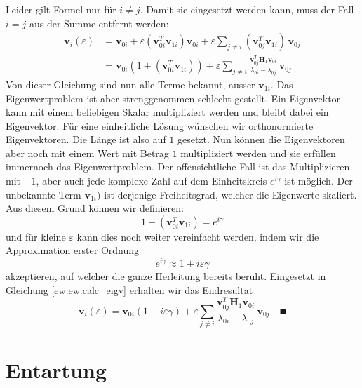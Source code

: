 Leider gilt Formel  nur für $i \neq j$. Damit sie eingesetzt werden kann, muss der Fall $i = j$ aus der Summe entfernt werden:
\begin{align}
    \bm v_i(\varepsilon)
    &=
    \bm v_{0i} + \varepsilon \left( \bm v_{0i}^T \bm v_{1i} \right) \bm v_{0i} + \varepsilon \sum_{j \neq i} \left(\bm v_{0j}^T \bm v_{1i} \right) \, \bm v_{0j} \\
    &=
    \bm v_{0i} \left( 1 + (\bm v_{0i}^T \bm v_{1i}) \right) + \varepsilon \sum_{j \neq i}
    \frac{\bm v_{0j}^T \bm H_1 \bm v_{0i}}{\lambda_{0i} - \lambda_{0j}}
    \, \bm v_{0j} \label{ew:ew:calc_eigv}
\end{align}
Von dieser Gleichung sind nun alle Terme bekannt, ausser $\bm v_{1i}$.
Das Eigenwertproblem ist aber strenggenommen schlecht gestellt.
Ein Eigenvektor kann mit einem beliebigen Skalar multipliziert werden und bleibt dabei ein Eigenvektor.
Für eine einheitliche Lösung wünschen wir orthonormierte Eigenvektoren.
Die Länge ist also auf $1$ gesetzt.
Nun können die Eigenvektoren aber noch mit einem Wert mit Betrag $1$ multipliziert werden und sie erfüllen immernoch das Eigenwertproblem.
Der offensichtliche Fall ist das Multiplizieren mit $-1$, aber auch jede komplexe Zahl auf dem Einheitskreis $e^{i\gamma}$ ist möglich.
Der unbekannte Term $\bm v_{1i})$ ist derjenige Freiheitsgrad, welcher die Eigenwerte skaliert.
Aus diesem Grund können wir definieren:
\begin{equation}
    1 + (\bm v_{0i}^T \bm v_{1i}) = e^{i\gamma}
\end{equation}
und für kleine $\varepsilon$ kann dies noch weiter vereinfacht werden, indem wir die Approximation erster Ordnung
\begin{equation}
    e^{i\gamma} \approx 1 + i \varepsilon \gamma
\end{equation}
akzeptieren, auf welcher die ganze Herleitung bereits beruht.
Eingesetzt in Gleichung \eqref{ew:ew:calc_eigv} erhalten wir das Endresultat
\begin{equation}
    \bm v_i(\varepsilon)
    =
    \bm v_{0i} \left( 1 + i \varepsilon \gamma \right) + \varepsilon \sum_{j \neq i}
    \frac{\bm v_{0j}^T \bm H_1 \bm v_{0i}}{\lambda_{0i} - \lambda_{0j}}
    \, \bm v_{0j}
    \quad
    \QED
    \label{ew:eq:explicit_eigvecs}
\end{equation}

\section{Entartung}

